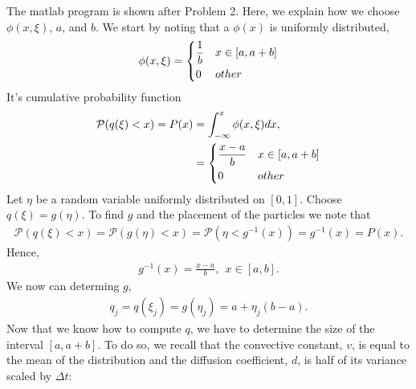 \begin{questions}
\begin{solution}
The matlab program is shown after Problem 2. Here, we explain how we choose $\phi(x,\xi)$, $a$, and $b$.
We start by noting that a $\phi(x)$ is uniformly distributed,
\begin{align}
\phi(x,\xi) = \begin{dcases}
   \frac{1}{b} & x\in[a,a+b] \\
             0 & other
\end{dcases}
\end{align}
It's cumulative probability function
\begin{align}
\mathcal{P}(q(\xi)<x) = P(x) &= \int_{-\infty}^x\phi(x,\xi)dx,\nonumber \\ &= \begin{dcases}
   \frac{x-a}{b} & x\in[a,a+b] \\
             0 & other
\end{dcases}
\end{align}
Let $\eta$ be a random variable uniformly distributed on $[0,1]$. Choose $q(\xi) = g(\eta)$. To find $g$ and the placement of the particles we note that
\begin{align}
\mathcal{P}(q(\xi)<x) = \mathcal{P}(g(\eta)<x) = \mathcal{P}(\eta<g^{-1}(x)) = g^{-1}(x) = P(x).
\end{align}
Hence, 
\begin{align}
g^{-1}(x) = \frac{x-a}{b},~~ x\in[a,b].
\end{align}
We now can determing $g$,
\begin{align}
q_j = q(\xi_j) = g(\eta_j) = a+\eta_j(b-a).
\end{align}
Now that we know how to compute $q$, we have to determine the size of the interval $[a,a+b]$. To do so, we recall that the convective constant, $v$, is equal to the mean of the distribution and the diffusion coefficient, $d$, is half of its variance scaled by $\Delta t$:
\begin{align}

\end{align}
\end{solution}
\end{questions}

